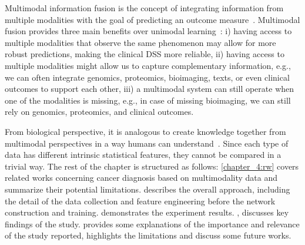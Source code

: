 \hspace*{3.5mm} Multimodal information fusion is the concept of integrating information from multiple modalities with the goal of predicting an outcome measure~\cite{mmsurvey,mmdcae}. Multimodal fusion provides three main benefits over unimodal learning~\cite{mmsurvey}: i) having access to multiple modalities that observe the same phenomenon may allow for more robust predictions, making the clinical DSS more reliable, ii) having access to multiple modalities might allow us to capture complementary information, e.g., we can often integrate genomics, proteomics, bioimaging, texts, or even clinical outcomes to support each other, iii) a multimodal system can still operate when one of the modalities is missing, e.g., in case of missing bioimaging, we can still rely on genomics, proteomics, and clinical outcomes.

\hspace*{3.5mm} From biological perspective, it is analogous to create knowledge together from multimodal perspectives in a way humans can understand~\cite{mmdcae}. Since each type of data has different intrinsic statistical features, they cannot be compared in a trivial way. The rest of the chapter is structured as follows: \cref{chapter_4:rw} covers related works concerning cancer diagnosis based on multimodality data and summarize their potential limitations.  describes the overall approach, including the detail of the data collection and feature engineering before the network construction and training.  demonstrates the experiment results. , discusses key findings of the study.  provides some explanations of the importance and relevance of the study reported, highlights the limitations and discuss some future works. %

